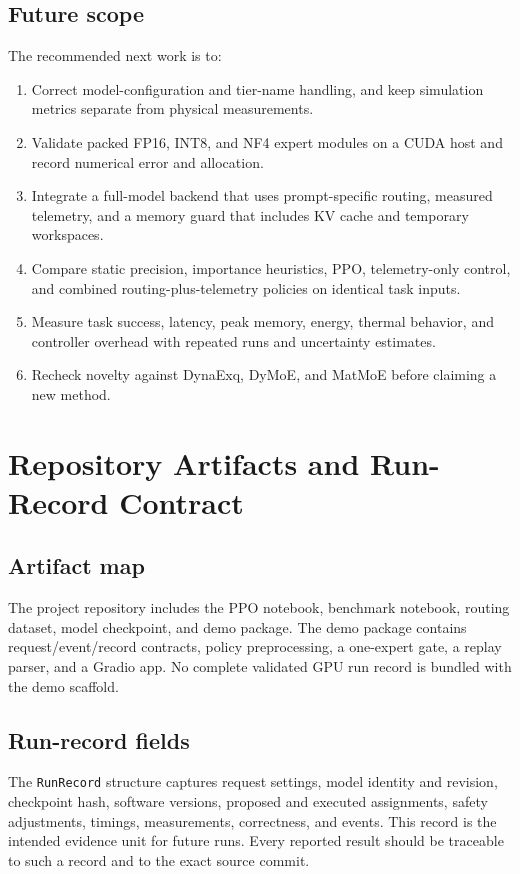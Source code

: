 \documentclass[12pt,a4paper]{report}
\begin{document}
\section{Future scope}
The recommended next work is to:
\begin{enumerate}
  \item Correct model-configuration and tier-name handling, and keep simulation metrics separate from physical measurements.
  \item Validate packed FP16, INT8, and NF4 expert modules on a CUDA host and record numerical error and allocation.
  \item Integrate a full-model backend that uses prompt-specific routing, measured telemetry, and a memory guard that includes KV cache and temporary workspaces.
  \item Compare static precision, importance heuristics, PPO, telemetry-only control, and combined routing-plus-telemetry policies on identical task inputs.
  \item Measure task success, latency, peak memory, energy, thermal behavior, and controller overhead with repeated runs and uncertainty estimates.
  \item Recheck novelty against DynaExq, DyMoE, and MatMoE before claiming a new method.
\end{enumerate}

\appendix
\chapter{Repository Artifacts and Run-Record Contract}
\section{Artifact map}
The project repository includes the PPO notebook, benchmark notebook, routing dataset, model checkpoint, and demo package. The demo package contains request/event/record contracts, policy preprocessing, a one-expert gate, a replay parser, and a Gradio app. No complete validated GPU run record is bundled with the demo scaffold.

\section{Run-record fields}
The \texttt{RunRecord} structure captures request settings, model identity and revision, checkpoint hash, software versions, proposed and executed assignments, safety adjustments, timings, measurements, correctness, and events. This record is the intended evidence unit for future runs. Every reported result should be traceable to such a record and to the exact source commit.
\end{document}
